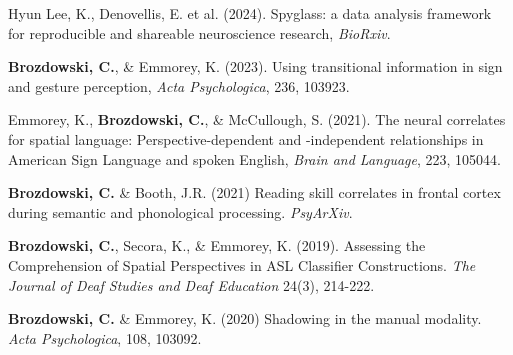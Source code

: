 

\par
\begin{cvparagraphlist}
  Hyun Lee, K., Denovellis, E. et al. (2024). Spyglass: a data analysis framework for reproducible and shareable neuroscience research, \textit{BioRxiv}. \par
  \textbf{Brozdowski, C.}, \& Emmorey, K. (2023). Using transitional information in sign and gesture perception, \textit{Acta Psychologica}, 236, 103923. \par
  Emmorey, K., \textbf{Brozdowski, C.}, \& McCullough, S. (2021). The neural correlates for spatial language: Perspective-dependent and -independent relationships in American Sign Language and spoken English, \textit{Brain and Language}, 223, 105044. \par 
  \textbf{Brozdowski, C.} \& Booth, J.R. (2021) Reading skill correlates in frontal cortex during semantic and phonological processing. \textit{PsyArXiv}. \par 
  \textbf{Brozdowski, C.}, Secora, K., \& Emmorey, K. (2019). Assessing the Comprehension of Spatial Perspectives in ASL Classifier Constructions. \textit{The Journal of Deaf Studies and Deaf Education} 24(3), 214-222. \par 
  \textbf{Brozdowski, C.} \& Emmorey, K. (2020) Shadowing in the manual modality. \textit{Acta Psychologica}, 108, 103092. \par 
\end{cvparagraphlist}

